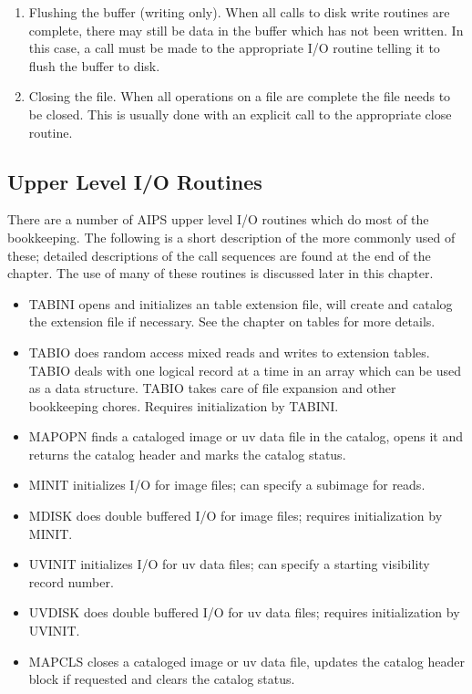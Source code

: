 \begin{enumerate}
\item Flushing the buffer (writing only). When all calls to disk write
routines are complete, there may still be data in the buffer which has
not been written.  In this case, a call must be made to the
appropriate I/O routine telling it to flush the buffer to disk.

\item Closing the file.  When all operations on a file are complete the file
needs to be closed.  This is usually done with an explicit call to the
appropriate close routine.


\end{enumerate} %

\subsection{Upper Level I/O Routines}
There are a number of AIPS upper level I/O routines which do most of
the bookkeeping.  The following is a short description of the more
commonly used of these; detailed descriptions of the call sequences
are found at the end of the chapter.  The use of many of these
routines is discussed later in this chapter.
\begin{itemize} %
\item TABINI opens and initializes an table extension file, will
create and catalog the extension file if necessary.  See the chapter
on tables for more details.
\item TABIO does random access mixed reads and writes to extension tables.
TABIO deals with one logical record at a time in an array which can be
used as a data structure.  TABIO takes care of file expansion and
other bookkeeping chores.  Requires initialization by TABINI.
\item MAPOPN finds a cataloged image or uv data file in the catalog, opens
it and returns the catalog header and marks the catalog status.
\item MINIT initializes I/O for image files; can specify a subimage for
reads.
\item MDISK does double buffered I/O for image files; requires
initialization by MINIT.
\item UVINIT initializes I/O for uv data files; can specify a starting
visibility record number.
\item UVDISK does double buffered I/O for uv data files; requires
initialization by UVINIT.
\item MAPCLS closes a cataloged image or uv data file, updates the catalog
header block if requested and clears the catalog status.
\end{itemize} %
